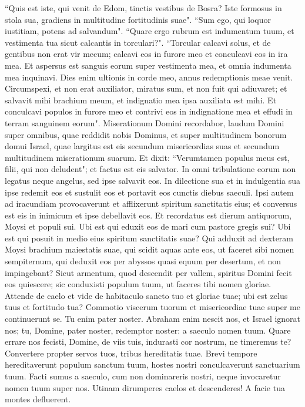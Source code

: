 \begin{biblechapter}  
\verse “Quis est iste, qui venit de Edom, tinctis vestibus de Bosra? Iste formosus in stola sua, gradiens in multitudine fortitudinis suae". “Sum ego, qui loquor iustitiam, potens ad salvandum". 
\verse “Quare ergo rubrum est indumentum tuum, et vestimenta tua sicut calcantis in torculari?". 
\verse “Torcular calcavi solus, et de gentibus non erat vir mecum; calcavi eos in furore meo et conculcavi eos in ira mea. Et aspersus est sanguis eorum super vestimenta mea, et omnia indumenta mea inquinavi. 
\verse Dies enim ultionis in corde meo, annus redemptionis meae venit. 
\verse Circumspexi, et non erat auxiliator, miratus sum, et non fuit qui adiuvaret; et salvavit mihi brachium meum, et indignatio mea ipsa auxiliata est mihi. 
\verse Et conculcavi populos in furore meo et contrivi eos in indignatione mea et effudi in terram sanguinem eorum". 
\verse Miserationum Domini recordabor, laudum Domini super omnibus, quae reddidit nobis Dominus, et super multitudinem bonorum domui Israel, quae largitus est eis secundum misericordias suas et secundum multitudinem miserationum suarum. 
\verse Et dixit: “Verumtamen populus meus est, filii, qui non deludent"; et factus est eis salvator. 
\verse In omni tribulatione eorum non legatus neque angelus, sed ipse salvavit eos. In dilectione sua et in indulgentia sua ipse redemit eos et sustulit eos et portavit eos cunctis diebus saeculi. 
\verse Ipsi autem ad iracundiam provocaverunt et afflixerunt spiritum sanctitatis eius; et conversus est eis in inimicum et ipse debellavit eos. 
\verse Et recordatus est dierum antiquorum, Moysi et populi sui. Ubi est qui eduxit eos de mari cum pastore gregis sui? Ubi est qui posuit in medio eius spiritum sanctitatis suae? 
\verse Qui adduxit ad dexteram Moysi brachium maiestatis suae, qui scidit aquas ante eos, ut faceret sibi nomen sempiternum, 
\verse qui deduxit eos per abyssos quasi equum per desertum, et non impingebant? 
\verse Sicut armentum, quod descendit per vallem, spiritus Domini fecit eos quiescere; sic conduxisti populum tuum, ut faceres tibi nomen gloriae. 
\verse Attende de caelo et vide de habitaculo sancto tuo et gloriae tuae; ubi est zelus tuus et fortitudo tua? Commotio viscerum tuorum et misericordiae tuae super me continuerunt se. 
\verse Tu enim pater noster. Abraham enim nescit nos, et Israel ignorat nos; tu, Domine, pater noster, redemptor noster: a saeculo nomen tuum. 
\verse Quare errare nos fecisti, Domine, de viis tuis, indurasti cor nostrum, ne timeremus te? Convertere propter servos tuos, tribus hereditatis tuae. 
\verse Brevi tempore hereditaverunt populum sanctum tuum, hostes nostri conculcaverunt sanctuarium tuum. 
\verse Facti sumus a saeculo, cum non dominareris nostri, neque invocaretur nomen tuum super nos. Utinam dirumperes caelos et descenderes! A facie tua montes defluerent. 
\end{biblechapter}

